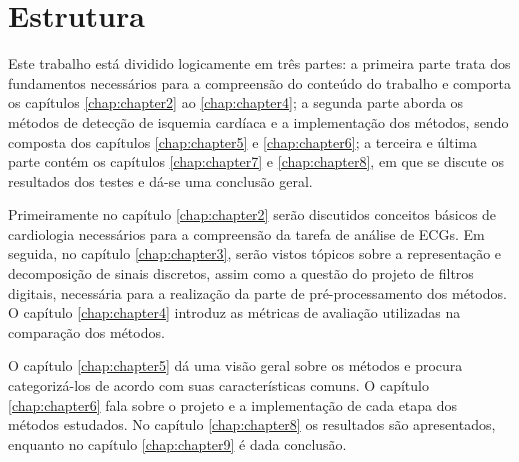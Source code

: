\section{Estrutura}
Este trabalho está dividido logicamente em três partes: a primeira parte trata dos fundamentos necessários para a compreensão do conteúdo do trabalho e comporta os capítulos \ref{chap:chapter2} ao \ref{chap:chapter4}; a segunda parte aborda os métodos de detecção de isquemia cardíaca e a implementação dos métodos, sendo composta dos capítulos \ref{chap:chapter5} e \ref{chap:chapter6}; a terceira e última parte contém os capítulos \ref{chap:chapter7} e \ref{chap:chapter8}, em que se discute os resultados dos testes e dá-se uma conclusão geral.

Primeiramente no capítulo \ref{chap:chapter2} serão discutidos conceitos básicos de cardiologia necessários para a compreensão da tarefa de análise de ECGs. Em seguida, no capítulo \ref{chap:chapter3}, serão vistos tópicos sobre a representação e decomposição de sinais discretos, assim como a questão do projeto de filtros digitais, necessária para a realização da parte de pré-processamento dos métodos. O capítulo \ref{chap:chapter4} introduz as métricas de avaliação utilizadas na comparação dos métodos.

O capítulo \ref{chap:chapter5} dá uma visão geral sobre os métodos e procura categorizá-los de acordo com suas características comuns. O capítulo \ref{chap:chapter6} fala sobre o projeto e a implementação de cada etapa dos métodos estudados. No capítulo \ref{chap:chapter8} os resultados são apresentados, enquanto no capítulo \ref{chap:chapter9} é dada conclusão.